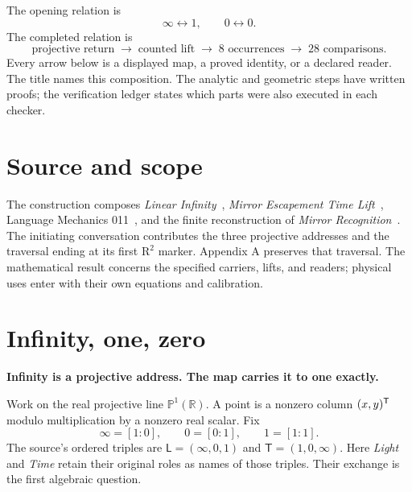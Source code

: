 \documentclass[11pt]{article}
\theoremstyle{definition}\newtheorem{definition}[theorem]{Definition}
\newcommand{\R}{\mathbb R}\newcommand{\C}{\mathbb C}\newcommand{\Z}{\mathbb Z}\newcommand{\N}{\mathbb N}\newcommand{\PP}{\mathbb P}
\newcommand{\lead}[1]{\textbf{#1}\par}
\newcommand{\page}{\clearpage}
\begin{document}
The opening relation is
\[
\boxed{\infty\longleftrightarrow1,\qquad0\longleftrightarrow0.}
\]
The completed relation is
\[
\boxed{\text{projective return}\;\longrightarrow\;
\text{counted lift}\;\longrightarrow\;
8\text{ occurrences}\;\longrightarrow\;28\text{ comparisons}.}
\]
Every arrow below is a displayed map, a proved identity, or a declared reader. The title names this composition. The analytic and geometric steps have written proofs; the verification ledger states which parts were also executed in each checker.

\section*{Source and scope}
The construction composes \emph{Linear Infinity}~\cite{LI}, \emph{Mirror Escapement Time Lift}~\cite{METL}, Language Mechanics 011~\cite{LM11}, and the finite reconstruction of \emph{Mirror Recognition}~\cite{MR}. The initiating conversation contributes the three projective addresses and the traversal ending at its first $\mathrm{R}^{2}$ marker. Appendix A preserves that traversal. The mathematical result concerns the specified carriers, lifts, and readers; physical uses enter with their own equations and calibration.

\page
\section{Infinity, one, zero}
\lead{Infinity is a projective address. The map carries it to one exactly.}
Work on the real projective line $\PP^1(\R)$. A point is a nonzero column $(x,y)^\mathsf T$ modulo multiplication by a nonzero real scalar. Fix
\begin{equation}
 \infty=[1:0],\qquad0=[0:1],\qquad1=[1:1].
 \label{eq:addresses}
\end{equation}
The source's ordered triples are $\mathsf L=(\infty,0,1)$ and $\mathsf T=(1,0,\infty)$. Here \emph{Light} and \emph{Time} retain their original roles as names of those triples. Their exchange is the first algebraic question.
\end{document}
